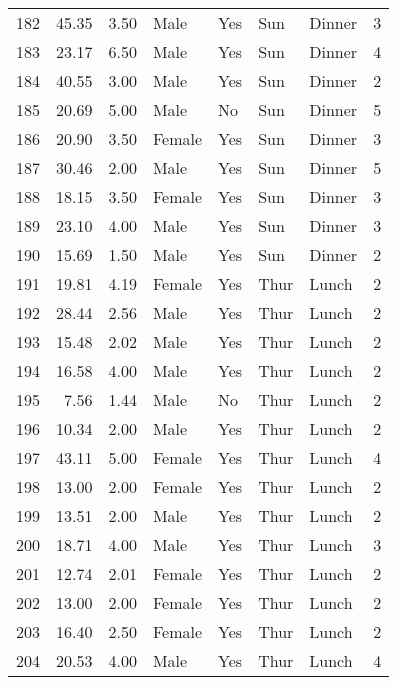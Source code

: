 \begin{tabular}{lrrllllr}
182 &       45.35 &   3.50 &    Male &    Yes &   Sun &  Dinner &     3 \\
183 &       23.17 &   6.50 &    Male &    Yes &   Sun &  Dinner &     4 \\
184 &       40.55 &   3.00 &    Male &    Yes &   Sun &  Dinner &     2 \\
185 &       20.69 &   5.00 &    Male &     No &   Sun &  Dinner &     5 \\
186 &       20.90 &   3.50 &  Female &    Yes &   Sun &  Dinner &     3 \\
187 &       30.46 &   2.00 &    Male &    Yes &   Sun &  Dinner &     5 \\
188 &       18.15 &   3.50 &  Female &    Yes &   Sun &  Dinner &     3 \\
189 &       23.10 &   4.00 &    Male &    Yes &   Sun &  Dinner &     3 \\
190 &       15.69 &   1.50 &    Male &    Yes &   Sun &  Dinner &     2 \\
191 &       19.81 &   4.19 &  Female &    Yes &  Thur &   Lunch &     2 \\
192 &       28.44 &   2.56 &    Male &    Yes &  Thur &   Lunch &     2 \\
193 &       15.48 &   2.02 &    Male &    Yes &  Thur &   Lunch &     2 \\
194 &       16.58 &   4.00 &    Male &    Yes &  Thur &   Lunch &     2 \\
195 &        7.56 &   1.44 &    Male &     No &  Thur &   Lunch &     2 \\
196 &       10.34 &   2.00 &    Male &    Yes &  Thur &   Lunch &     2 \\
197 &       43.11 &   5.00 &  Female &    Yes &  Thur &   Lunch &     4 \\
198 &       13.00 &   2.00 &  Female &    Yes &  Thur &   Lunch &     2 \\
199 &       13.51 &   2.00 &    Male &    Yes &  Thur &   Lunch &     2 \\
200 &       18.71 &   4.00 &    Male &    Yes &  Thur &   Lunch &     3 \\
201 &       12.74 &   2.01 &  Female &    Yes &  Thur &   Lunch &     2 \\
202 &       13.00 &   2.00 &  Female &    Yes &  Thur &   Lunch &     2 \\
203 &       16.40 &   2.50 &  Female &    Yes &  Thur &   Lunch &     2 \\
204 &       20.53 &   4.00 &    Male &    Yes &  Thur &   Lunch &     4 \\

\end{tabular}
